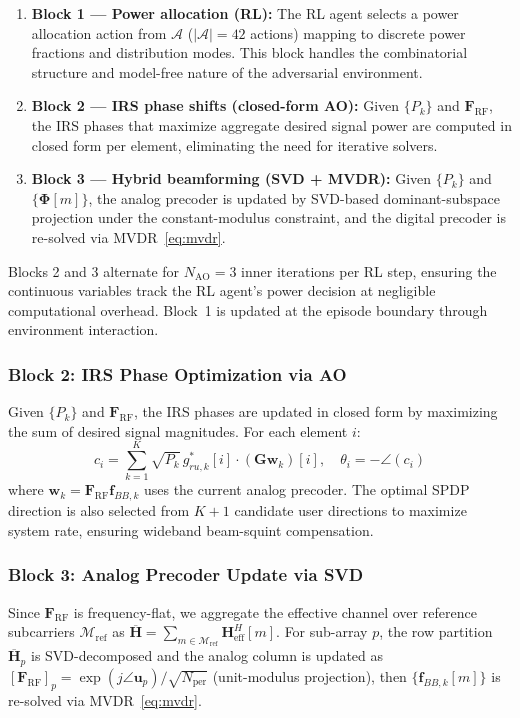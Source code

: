 \documentclass[journal,twocolumn]{IEEEtran}
\newcommand{\vect}[1]{\mathbf{#1}}
\newcommand{\mat}[1]{\mathbf{#1}}
\begin{document}
\begin{enumerate}
\item \textbf{Block 1 — Power allocation (RL):} The RL agent selects a power allocation action from $\mathcal{A}$ ($|\mathcal{A}|=42$ actions) mapping to discrete power fractions and distribution modes. This block handles the combinatorial structure and model-free nature of the adversarial environment.
\item \textbf{Block 2 — IRS phase shifts (closed-form AO):} Given $\{P_k\}$ and $\mat{F}_{\text{RF}}$, the IRS phases that maximize aggregate desired signal power are computed in closed form per element, eliminating the need for iterative solvers.
\item \textbf{Block 3 — Hybrid beamforming (SVD + MVDR):} Given $\{P_k\}$ and $\{\bm{\Phi}[m]\}$, the analog precoder is updated by SVD-based dominant-subspace projection under the constant-modulus constraint, and the digital precoder is re-solved via MVDR~\eqref{eq:mvdr}.
\end{enumerate}

Blocks 2 and 3 alternate for $N_{\text{AO}}=3$ inner iterations per RL step, ensuring the continuous variables track the RL agent's power decision at negligible computational overhead. Block~1 is updated at the episode boundary through environment interaction.

\subsubsection{Block 2: IRS Phase Optimization via AO}
Given $\{P_k\}$ and $\mat{F}_{\text{RF}}$, the IRS phases are updated in closed form by maximizing the sum of desired signal magnitudes. For each element $i$:
\begin{equation}
c_i = \sum_{k=1}^{K}\sqrt{P_k}\,g_{ru,k}^*[i]\cdot(\mat{G}\vect{w}_k)[i], \quad \theta_i = -\angle(c_i)
\label{eq:ao_phase}
\end{equation}
where $\vect{w}_k = \mat{F}_{\text{RF}}\vect{f}_{BB,k}$ uses the current analog precoder. The optimal SPDP direction is also selected from $K+1$ candidate user directions to maximize system rate, ensuring wideband beam-squint compensation.

\subsubsection{Block 3: Analog Precoder Update via SVD}
Since $\mat{F}_{\text{RF}}$ is frequency-flat, we aggregate the effective channel over reference subcarriers $\mathcal{M}_{\text{ref}}$ as $\overline{\mat{H}} = \sum_{m \in \mathcal{M}_{\text{ref}}} \vect{H}_{\text{eff}}^H[m]$. For sub-array $p$, the row partition $\overline{\mat{H}}_p$ is SVD-decomposed and the analog column is updated as $[\mat{F}_{\text{RF}}]_p = \exp(j\angle\vect{u}_p)/\sqrt{N_{\text{per}}}$ (unit-modulus projection), then $\{\vect{f}_{BB,k}[m]\}$ is re-solved via MVDR~\eqref{eq:mvdr}.
\end{document}
